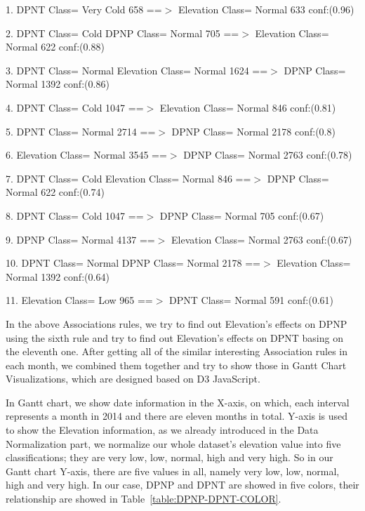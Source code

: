 \documentclass[11pt]{article}
\begin{document}
1.  DPNT Class= Very Cold 658 ==$>$  Elevation Class= Normal 633    conf:(0.96)

2.  DPNT Class= Cold  DPNP Class= Normal 705 ==$>$  Elevation Class= Normal 622    conf:(0.88)

3.  DPNT Class= Normal  Elevation Class= Normal 1624 ==$>$  DPNP Class= Normal 1392    conf:(0.86)

4.  DPNT Class= Cold 1047 ==$>$  Elevation Class= Normal 846    conf:(0.81)

5.  DPNT Class= Normal 2714 ==$>$  DPNP Class= Normal 2178    conf:(0.8)

6.  Elevation Class= Normal 3545 ==$>$  DPNP Class= Normal 2763    conf:(0.78)

7.  DPNT Class= Cold  Elevation Class= Normal 846 ==$>$  DPNP Class= Normal 622    conf:(0.74)

8.  DPNT Class= Cold 1047 ==$>$  DPNP Class= Normal 705    conf:(0.67)

9.  DPNP Class= Normal 4137 ==$>$  Elevation Class= Normal 2763    conf:(0.67)

10.  DPNT Class= Normal  DPNP Class= Normal 2178 ==$>$  Elevation Class= Normal 1392    conf:(0.64)

11.  Elevation Class= Low 965 ==$>$  DPNT Class= Normal 591    conf:(0.61)

In the above Associations rules, we try to find out Elevation\rq s effects on DPNP using the sixth rule and try to find out Elevation\rq s effects on DPNT basing on the eleventh one. After getting all of the similar interesting Association rules in each month, we combined them together and try to show those in Gantt Chart Visualizations, which are designed based on D3 JavaScript.

In Gantt chart, we show date information in the X-axis, on which, each interval represents a month in 2014 and there are eleven months in total.  Y-axis is used to show the Elevation information, as we already introduced in the Data Normalization part, we normalize our whole dataset’s elevation value into five classifications; they are very low, low, normal, high and very high. So in our Gantt chart Y-axis, there are five values in all, namely very low, low, normal, high and very high. In our case, DPNP and DPNT are showed in five colors, their relationship are showed in Table~\ref{table:DPNP-DPNT-COLOR}.
\end{document}
